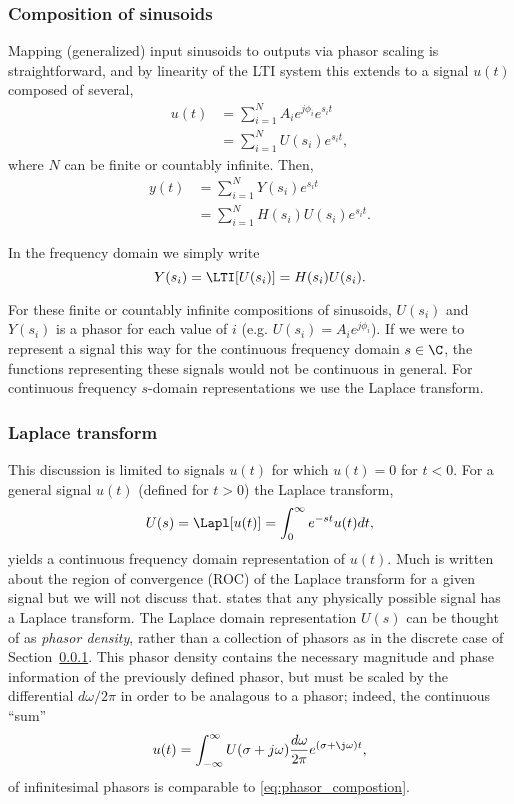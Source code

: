 \subsubsection{Composition of sinusoids}\label{sec:composition}
Mapping (generalized) input sinusoids to outputs via phasor scaling is straightforward, and by linearity of the LTI system this extends  to a signal $u(t)$ composed of several,
\begin{align}
u(t) &= \sum_{i=1}^N A_i e^{j\phi_i}e^{s_i t}\nonumber\\
	&= \sum_{i=1}^N U(s_i) e^{s_i t},
\label{eq:phasor_compostion}
\end{align}
where $N$ can be finite or countably infinite.    Then,
\begin{align*}
y(t) &= \sum_{i=1}^N Y(s_i) e^{s_i t}\\
&=  \sum_{i=1}^N H(s_i)U(s_i) e^{s_i t}. 
\end{align*}

 In the frequency domain we simply write
\begin{equation*}
Y(s_i) = \LTI[U(s_i)] = H(s_i)U(s_i).
\end{equation*}


For these finite or countably infinite compositions of sinusoids,  $U(s_i)$ and $Y(s_i)$ is a phasor for each value of $i$ (e.g. $U(s_i)=A_ie^{j\phi_i}$).   If we were to represent a signal  this way for the continuous frequency domain  $s\in\C$, the functions representing these signals would not be continuous in general.   For continuous frequency $s$-domain representations we use the Laplace transform.   
  
\subsubsection{Laplace transform}\label{sec:Laplace}
This discussion is limited to signals $u(t)$ for which $u(t)=0$ for $t<0$. 
For a general signal $u(t)$ (defined for $t>0$) the Laplace transform,
\begin{equation}
U(s) = \Lapl[u(t)] = \int_{0}^\infty e^{-st} u(t) dt,
\label{eq:def_LT}
\end{equation}
yields a continuous frequency domain representation of $u(t)$.  Much is written about the region of convergence (ROC) of the Laplace transform for a given signal but we will not discuss that.  \cite{dorf2004introduction} states that any physically possible signal has a Laplace transform.  The Laplace domain representation $U(s)$  can be thought of as \emph{phasor density}, rather than a collection of phasors as in the discrete case of Section~\ref{sec:composition}.  This phasor density contains the necessary magnitude and phase information of the previously defined phasor, but must be scaled by the differential $d\omega/2\pi$ in order to be analagous to  a phasor;  indeed, the continuous ``sum''   
\begin{equation}
u(t) = \int_{-\infty}^\infty U(\sigma + j\omega) \frac{d\omega}{2\pi}e^{(\sigma + \j\omega)t},
\label{eq:inverse_Laplace}
\end{equation}
of infinitesimal phasors is comparable to \eqref{eq:phasor_compostion}.  

